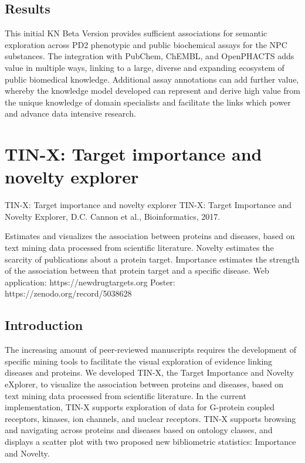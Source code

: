 \subsection{Results}

This initial KN Beta Version provides sufficient associations for semantic exploration across PD2 phenotypic and public biochemical assays for the NPC substances.  The integration with PubChem, ChEMBL, and OpenPHACTS adds value in multiple ways, linking to a large, diverse and expanding ecosystem of public biomedical knowledge.  Additional assay annotations can add further value, whereby the knowledge model developed can represent and derive high value from the unique knowledge of domain specialists and facilitate the links which power and advance data intensive research.



\section{TIN-X: Target importance and novelty explorer}

TIN-X: Target importance and novelty explorer
TIN-X: Target Importance and Novelty Explorer, D.C. Cannon et al., Bioinformatics, 2017\cite{Cannon2017-af}.

Estimates and visualizes the association between proteins and diseases, based on text mining data processed from scientific literature.  Novelty estimates the scarcity of publications about a protein target. Importance estimates the strength of the association between that protein target and a specific disease.
Web application: https://newdrugtargets.org
Poster: https://zenodo.org/record/5038628

\subsection{Introduction}

The increasing amount of peer-reviewed manuscripts requires the development of specific mining tools to facilitate the visual exploration of evidence linking diseases and proteins. We developed TIN-X, the Target Importance and Novelty eXplorer, to visualize the association between proteins and diseases, based on text mining data processed from scientific literature. In the current implementation, TIN-X supports exploration of data for G-protein coupled receptors, kinases, ion channels, and nuclear receptors. TIN-X supports browsing and navigating across proteins and diseases based on ontology classes, and displays a scatter plot with two proposed new bibliometric statistics: Importance and Novelty. 

